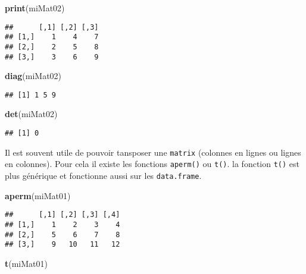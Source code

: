 \documentclass[]{book}
\newenvironment{Shaded}{\begin{snugshade}}{\end{snugshade}}
\newcommand{\KeywordTok}[1]{\textcolor[rgb]{0.13,0.29,0.53}{\textbf{#1}}}
\newcommand{\NormalTok}[1]{#1}
\theoremstyle{definition}
\theoremstyle{definition}
\theoremstyle{definition}
\theoremstyle{remark}
\begin{document}
\begin{Shaded}
\begin{Highlighting}[]
\KeywordTok{print}\NormalTok{(miMat02)}
\end{Highlighting}
\end{Shaded}

\begin{verbatim}
##      [,1] [,2] [,3]
## [1,]    1    4    7
## [2,]    2    5    8
## [3,]    3    6    9
\end{verbatim}

\begin{Shaded}
\begin{Highlighting}[]
\KeywordTok{diag}\NormalTok{(miMat02)}
\end{Highlighting}
\end{Shaded}

\begin{verbatim}
## [1] 1 5 9
\end{verbatim}

\begin{Shaded}
\begin{Highlighting}[]
\KeywordTok{det}\NormalTok{(miMat02)}
\end{Highlighting}
\end{Shaded}

\begin{verbatim}
## [1] 0
\end{verbatim}

Il est souvent utile de pouvoir tansposer une \texttt{matrix} (colonnes
en lignes ou lignes en colonnes). Pour cela il existe les fonctions
\texttt{aperm()} ou \texttt{t()}. la fonction \texttt{t()} est plus
générique et fonctionne aussi sur les \texttt{data.frame}.

\begin{Shaded}
\begin{Highlighting}[]
\KeywordTok{aperm}\NormalTok{(miMat01)}
\end{Highlighting}
\end{Shaded}

\begin{verbatim}
##      [,1] [,2] [,3] [,4]
## [1,]    1    2    3    4
## [2,]    5    6    7    8
## [3,]    9   10   11   12
\end{verbatim}

\begin{Shaded}
\begin{Highlighting}[]
\KeywordTok{t}\NormalTok{(miMat01)}
\end{Highlighting}
\end{Shaded}
\end{document}

